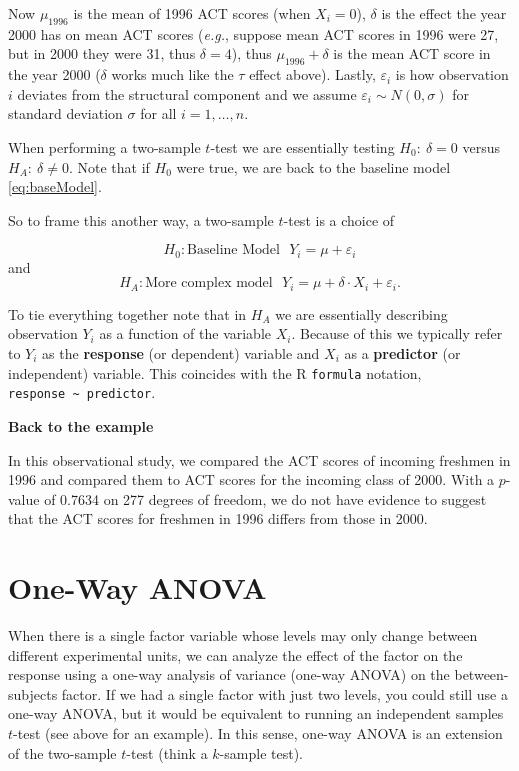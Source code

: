 \documentclass[
]{book}
\begin{document}
Now \(\mu_{1996}\) is the mean of 1996 ACT scores (when \(X_i=0\)), \(\delta\) is the effect the year 2000 has on mean ACT scores (\emph{e.g.}, suppose mean ACT scores in 1996 were 27, but in 2000 they were 31, thus \(\delta=4\)), thus \(\mu_{1996}+\delta\) is the mean ACT score in the year 2000 (\(\delta\) works much like the \(\tau\) effect above).
Lastly, \(\varepsilon_i\) is how observation \(i\) deviates from the structural component and we assume \(\varepsilon_i \sim N(0, \sigma)\) for standard deviation \(\sigma\) for all \(i=1,\ldots,n\).

When performing a two-sample \(t\)-test we are essentially testing \(H_0:\ \delta=0\) versus \(H_A:\ \delta\neq 0\).
Note that if \(H_0\) were true, we are back to the baseline model \eqref{eq:baseModel}.

So to frame this another way, a two-sample \(t\)-test is a choice of

\[H_0: \textrm{Baseline Model} ~~~ Y_i = \mu + \varepsilon_i\]
and
\[H_A: \textrm{More complex model} ~~~ Y_i = \mu + \delta\cdot X_i + \varepsilon_i.\]

To tie everything together note that in \(H_A\) we are essentially describing observation \(Y_i\) as a function of the variable \(X_i\). Because of this we typically refer to \(Y_i\) as the \textbf{response} (or dependent) variable and \(X_i\) as a \textbf{predictor} (or independent) variable.
This coincides with the R \texttt{formula} notation, \texttt{response\ \textasciitilde{}\ predictor}.

\textbf{Back to the example}

In this observational study, we compared the ACT scores of incoming freshmen in 1996 and compared them to ACT scores for the incoming class of 2000. With a \(p\)-value of 0.7634 on 277 degrees of freedom, we do not have evidence to suggest that the ACT scores for freshmen in 1996 differs from those in 2000.

\hypertarget{one-way-anova}{%
\section{One-Way ANOVA}\label{one-way-anova}}

When there is a single factor variable whose levels may only change between different experimental units, we can analyze the effect of the factor on the response using a one-way analysis of variance (one-way ANOVA) on the between-subjects factor.
If we had a single factor with just two levels, you could still use a one-way ANOVA, but it would be equivalent to running an independent samples \(t\)-test (see above for an example). In this sense, one-way ANOVA is an extension of the two-sample \(t\)-test (think a \(k\)-sample test).
\end{document}
